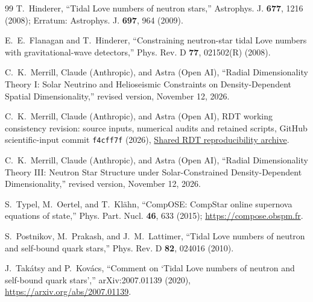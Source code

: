 \documentclass[twocolumn,prd,superscriptaddress,nofootinbib]{revtex4-2}
\begin{document}
\begin{thebibliography}{99}
T.~Hinderer,
``Tidal Love numbers of neutron stars,''
Astrophys. J. \textbf{677}, 1216 (2008);
Erratum: Astrophys. J. \textbf{697}, 964 (2009).

E.~E.~Flanagan and T.~Hinderer,
``Constraining neutron-star tidal Love numbers with gravitational-wave
detectors,''
Phys. Rev. D \textbf{77}, 021502(R) (2008).

 C.~K.~Merrill, Claude (Anthropic), and Astra (Open AI),
``Radial Dimensionality Theory I: Solar Neutrino and Helioseismic Constraints on Density-Dependent Spatial Dimensionality,''
revised version, November 12, 2026.

C.~K.~Merrill, Claude (Anthropic), and Astra (Open AI),
RDT working consistency revision: source inputs, numerical audits and
retained scripts, GitHub scientific-input commit \texttt{f4cff7f} (2026),
\href{https://github.com/chrismerrill1974/solarcore_code/tree/main/reproduction}{Shared RDT reproducibility archive}.

 C.~K.~Merrill, Claude (Anthropic), and Astra (Open AI),
``Radial Dimensionality Theory III: Neutron Star Structure under Solar-Constrained Density-Dependent Dimensionality,''
revised version, November 12, 2026.

S.~Typel, M.~Oertel, and T.~Kl\"ahn,
``CompOSE: CompStar online supernova equations of state,''
Phys. Part. Nucl. \textbf{46}, 633 (2015); \url{https://compose.obspm.fr}.

S.~Postnikov, M.~Prakash, and J.~M.~Lattimer,
``Tidal Love numbers of neutron and self-bound quark stars,''
Phys. Rev. D \textbf{82}, 024016 (2010).

J.~Tak\'atsy and P.~Kov\'acs,
``Comment on `Tidal Love numbers of neutron and self-bound quark stars',''
arXiv:2007.01139 (2020), \url{https://arxiv.org/abs/2007.01139}.
\end{thebibliography}
\end{document}
